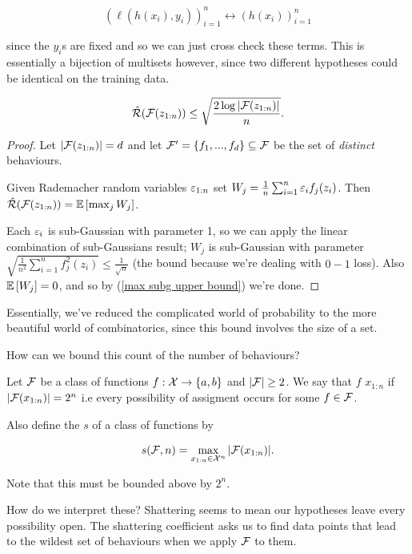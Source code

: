 \documentclass[11pt]{scrartcl}
\begin{document}
\begin{equation}
    ( \ell(h(x_i), y_i) )_{i=1}^n \leftrightarrow ( h(x_i) )_{i=1}^n
\end{equation}

since the $y_i$s are fixed and so we can just cross check these terms. This is essentially a bijection of multisets however, since two different hypotheses could be identical on the training data. %

\begin{theorem}
\label{empirical rad to combi}
\begin{equation}
\hat{\mathcal{R}}(\mathcal{F}(z_{1:n})) \le \sqrt{ \frac{2 \log |\mathcal{F}(z_{1:n})|}{n} }.
\end{equation}

\begin{proof} %
Let $| \mathcal{F}(z_{1:n}) | = d$ and let $\mathcal{F}' = \{f_1, ... , f_d\} \subseteq \mathcal{F}$ be the set of \textit{distinct} behaviours.

Given Rademacher random variables $\varepsilon_{1:n}$ set $W_j = \frac1n \sum_{i=1}^n \varepsilon_i f_j(z_i)$. Then $\hat{\mathcal{R}}(\mathcal{F}(z_{1:n})) = \mathbb{E} \left[ \max_j W_j \right]$.

Each $\varepsilon_i$ is sub-Gaussian with parameter 1, so we can apply the linear combination of sub-Gaussians result; $W_j$ is sub-Gaussian with parameter $\sqrt{\frac{1}{n^2} \sum_{i=1}^n f_j^2(z_i)}\le \frac{1}{\sqrt{n}}$ (the bound because we're dealing with $0-1$ loss). Also $\mathbb{E} \left[ W_j \right] = 0$, and so by (\ref{max subg upper bound}) we're done.
\end{proof}
\end{theorem}

Essentially, we've reduced the complicated world of probability to the more beautiful world of combinatorics, since this bound involves the size of a set.

How can we bound this count of the number of behaviours?

\begin{definition}
Let $\mathcal{F}$ be a class of functions $f:\mathcal{X} \rightarrow \{ a,b \}$ and $|\mathcal{F}| \ge 2$. We say that $f$  $x_{1:n}$ if $|\mathcal{F}(x_{1:n})| = 2^n$ i.e every possibility of assigment occurs for some $f \in \mathcal{F}$. 

Also define the  $s$ of a class of functions by

\begin{equation}
s(\mathcal{F}, n) = \max_{x_{1:n} \in \mathcal{X}^n} |\mathcal{F}(x_{1:n})|.
\end{equation}

Note that this must be bounded above by $2^n$. 

How do we interpret these? Shattering seems to mean our hypotheses leave every possibility open. The shattering coefficient asks us to find data points that lead to the wildest set of behaviours when we apply $\mathcal{F}$ to them.
\end{definition}
\end{document}
